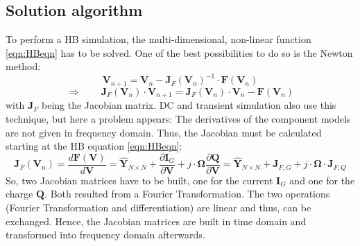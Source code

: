 \subsection{Solution algorithm}

To perform a HB simulation, the multi-dimensional, non-linear function
\ref{eqn:HBeqn} has to be solved. One of the best possibilities to
do so is the Newton method:
\begin{equation}
\textbf{V}_{n+1} = \textbf{V}_n - \textbf{J}_F (\textbf{V}_n)^{-1}
                   \cdot \textbf{F} (\textbf{V}_n)
\end{equation}
\begin{equation}
\Rightarrow \qquad \textbf{J}_F (\textbf{V}_n) \cdot \textbf{V}_{n+1}
    = \textbf{J}_F (\textbf{V}_n) \cdot \textbf{V}_n - \textbf{F} (\textbf{V}_n)
\end{equation}
with $\textbf{J}_F$ being the Jacobian matrix. DC and transient
simulation also use this technique, but here a problem appears:
The derivatives of the component models are not given in frequency
domain. Thus, the Jacobian must be calculated starting at the HB
equation \ref{eqn:HBeqn}:
\begin{equation}
\boldsymbol{J}_F (\boldsymbol{V}_n) = \frac{d\boldsymbol{F} (\boldsymbol{V})}{d\boldsymbol{V}}
    = \boldsymbol{\hat{Y}}_{N \times N} + \frac{\partial \boldsymbol{I}_G}{\partial \boldsymbol{V}}
     + j\cdot \boldsymbol{\Omega}\frac{\partial \boldsymbol{Q}}{\partial \boldsymbol{V}}
    = \boldsymbol{\hat{Y}}_{N \times N} + \boldsymbol{J}_{F,G}
     + j\cdot \boldsymbol{\Omega}\cdot\boldsymbol{J}_{F,Q}
\end{equation}
So, two Jacobian matrices have to be built, one for the current
$\boldsymbol{I}_G$ and one for the charge $\boldsymbol{Q}$. Both resulted
from a Fourier Transformation. The two operations (Fourier Transformation
and differentiation) are linear and thus, can be exchanged. Hence, the
Jacobian matrices
are built in time domain and transformed into frequency domain afterwards.

\addvspace{12pt}

